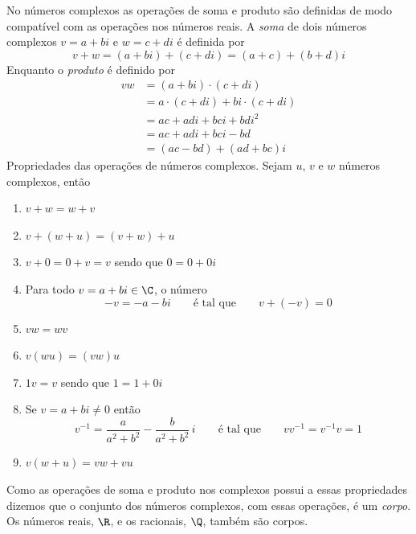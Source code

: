 No números complexos as operações de soma e produto são definidas
de modo compatível com as operações nos números reais.
A \emph{soma} de dois números complexos $v=a+bi$ e $w=c+di$ é definida por
\[
  v+w = (a+bi) + (c+di) = (a+c) + (b+d) i
\]
Enquanto o \emph{produto} é definido por
\begin{align*}
	vw & = (a+bi) \cdot (c+di)             \\
	   & = a \cdot (c+di) + bi \cdot(c+di) \\
	   & = ac + adi + bci + bdi^2          \\
	   & = ac + adi + bci - bd             \\
	   & = (ac-bd) + (ad+bc) i
\end{align*}
Propriedades das operações de números complexos. Sejam $u$, $v$ e $w$ números complexos, então
\begin{enumerate}[label=\alph*)]
\item \( v + w = w + v \)
\item \( v + (w + u) = ( v + w ) + u \)
\item \( v + 0 = 0 + v = v \) sendo que \( 0 = 0 + 0i \)
\item Para todo \(v=a+bi \in\C\), o número
      \[-v=-a-bi \qquad \text{é tal que} \qquad v+(-v) = 0 \]
\item \(vw = wv\)
\item \( v(wu) = (vw)u\)
\item \( 1v = v\) sendo que \(1=1+0i\)
\item Se \( v = a+bi \neq 0 \) então
      \[ v^{-1} = \frac{a}{a^2+b^2} - \frac{b}{a^2+b^2}\,i
        \qquad\text{é tal que} \qquad
        vv^{-1} = v^{-1}v = 1
      \]
\item \( v(w+u) = vw + vu  \)
\end{enumerate}
Como as operações de soma e produto nos complexos possui a essas propriedades
dizemos que o conjunto dos números complexos, com essas operações, é um \emph{corpo}.
Os números reais, $\R$, e os racionais, $\Q$, também são corpos.

